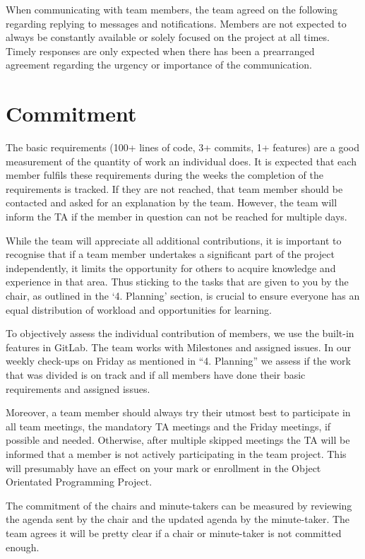 \documentclass[sigconf,nonacm]{acmart}
\begin{document}
When communicating with team members, the team agreed on the following regarding replying to messages and notifications. Members are not expected to always be constantly available or solely focused on the project at all times. Timely responses are only expected when there has been a prearranged agreement regarding the urgency or importance of the communication.


\section{Commitment}
The basic requirements (100+ lines of code, 3+ commits, 1+ features) are a good measurement of the quantity of work an individual does. It is expected that each member fulfils these requirements during the weeks the completion of the requirements is tracked. If they are not reached, that team member should be contacted and asked for an explanation by the team. However, the team will inform the TA if the member in question can not be reached for multiple days.

While the team will appreciate all additional contributions, it is important to recognise that if a team member undertakes a significant part of the project independently, it limits the opportunity for others to acquire knowledge and experience in that area. Thus sticking to the tasks that are given to you by the chair, as outlined in the ‘4. Planning’ section, is crucial to ensure everyone has an equal distribution of workload and opportunities for learning.

To objectively assess the individual contribution of members, we use the built-in features in GitLab. The team works with Milestones and assigned issues. In our weekly check-ups on Friday as mentioned in “4. Planning” we assess if the work that was divided is on track and if all members have done their basic requirements and assigned issues.

Moreover, a team member should always try their utmost best to participate in all team meetings, the mandatory TA meetings and the Friday meetings, if possible and needed. Otherwise, after multiple skipped meetings the TA will be informed that a member is not actively participating in the team project. This will presumably have an effect on your mark or enrollment in the Object Orientated Programming Project.

The commitment of the chairs and minute-takers can be measured by reviewing the agenda sent by the chair and the updated agenda by the minute-taker. The team agrees it will be pretty clear if a chair or minute-taker is not committed enough. 
\end{document}
